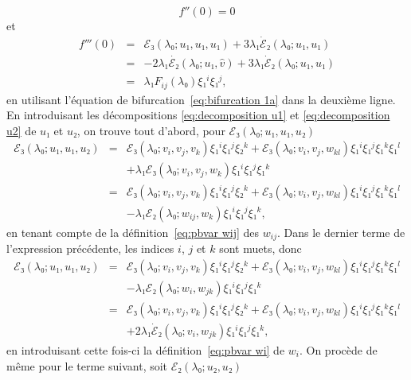 \documentclass[12pt, final]{amsart}
\theoremstyle{definition}
\begin{document}
\begin{equation}
 \label{eq:DL energie derivee 2nde} f''(0) = 0
\end{equation}
et
\begin{eqnarray}
 f'''(0) & = & ℰ₃(λ₀ ; u₁, u₁, u₁) + 3 λ₁
 \dot{ℰ}₂(λ₀ ; u₁, u₁) \nonumber\\
 & = & - 2 λ₁ \dot{ℰ₂}(λ₀ ; u₁, \hat{v}) + 3
 λ₁ \dot{ℰ}₂(λ₀ ; u₁, u₁) \nonumber\\
 & = & λ₁ F_{i j}(λ₀) ξ₁^i ξ₁^j, \label{eq:DL
 energie derivee 3ieme}
\end{eqnarray}
en utilisant l'équation de bifurcation~\eqref{eq:bifurcation 1a} dans la deuxième ligne. En introduisant les décompositions \eqref{eq:decomposition u1} et \eqref{eq:decomposition u2} de \(u₁\) et \(u₂\), on trouve tout d'abord, pour \(ℰ₃(λ₀ ; u₁, u₁, u₂)\)
\begin{eqnarray*}
 ℰ₃(λ₀ ; u₁, u₁, u₂) & = & ℰ₃(λ₀ ;
 v_i, v_j, v_k) ξ₁^i ξ₁^j ξ₂^k +ℰ₃(λ₀ ; v_i, v_j,
 w_{k l}) ξ₁^i ξ₁^j ξ₁^k ξ₁^l\\
 & & + λ₁ ℰ₃(λ₀ ; v_i, v_j, w_k)
 ξ₁^i ξ₁^j ξ₁^k\\
 & = & ℰ₃(λ₀ ; v_i, v_j, v_k) ξ₁^i ξ₁^j ξ₂^k
 +ℰ₃(λ₀ ; v_i, v_j, w_{k l}) ξ₁^i ξ₁^j
 ξ₁^k ξ₁^l\\
 & & - λ₁ ℰ₂(λ₀ ; w_{i j},
 w_k) ξ₁^i ξ₁^j ξ₁^k,
\end{eqnarray*}
en tenant compte de la définition~\eqref{eq:pbvar wij} des \(w_{i j}\). Dans le dernier terme de l'expression précédente, les indices \(i\), \(j\) et \(k\) sont muets, donc
\begin{eqnarray*}
 ℰ₃(λ₀ ; u₁, u₁, u₂) & = & ℰ₃(λ₀ ;
 v_i, v_j, v_k) ξ₁^i ξ₁^j ξ₂^k +ℰ₃(λ₀ ; v_i, v_j,
 w_{k l}) ξ₁^i ξ₁^j ξ₁^k ξ₁^l\\
 & & - λ₁ ℰ₂(λ₀ ; w_{i }, w_{j
  k}) ξ₁^i ξ₁^j ξ₁^k\\
 & = & ℰ₃(λ₀ ; v_i, v_j, v_k) ξ₁^i ξ₁^j ξ₂^k
 +ℰ₃(λ₀ ; v_i, v_j, w_{k l}) ξ₁^i ξ₁^j
 ξ₁^k ξ₁^l\\
 & & + 2 λ₁ \dot{ℰ}₂(λ₀ ; v_{i
 }, w_{j k}) ξ₁^i ξ₁^j ξ₁^k,
\end{eqnarray*}
en introduisant cette fois-ci la définition~\eqref{eq:pbvar wi} de \(w_i .\) On procède de même pour le terme suivant, soit \(ℰ₂(λ₀ ; u₂, u₂)\)
\end{document}
